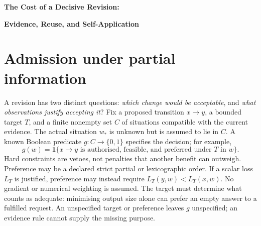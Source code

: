 \documentclass[11pt,letterpaper]{article}
\newcommand{\ind}{\mathbf 1}
\begin{document}
\begin{center}
{\Large\bfseries The Cost of a Decisive Revision:}\par
\vspace{4pt}
{\normalsize\bfseries Evidence, Reuse, and Self-Application}
\end{center}
\vspace{-3pt}
\begin{abstract}
A revision decision can be identifiable but unaffordable; evidence sufficient for it can become inadequate when its purpose changes. In a finite exact-observation model, standard decision-tree optimisation gives the minimum worst-case cost of a sound decision, both from current evidence and after reusing a retained record. A classical address-function example separates adaptive inquiry from a fixed test battery. Two elementary obstructions delimit evidence reuse and inference from behavioural parity, while a changing-objective cycle shows why locally justified revision need not terminate. The same account applies to revisions of a method and to revisions made with it. Its guarantees are relative to a specified decision rule and observation model; it neither selects the purpose nor certifies its own premises.
\end{abstract}

\section{Admission under partial information}
A revision has two distinct questions: \emph{which change would be acceptable}, and \emph{what observations justify accepting it}? Fix a proposed transition $x\to y$, a bounded target $T$, and a finite nonempty set $C$ of situations compatible with the current evidence. The actual situation $w_*$ is unknown but is assumed to lie in $C$. A known Boolean predicate $g:C\to\{0,1\}$ specifies the decision; for example,
\begin{equation}
 g(w)=\ind\{\text{$x\to y$ is authorised, feasible, and preferred under $T$ in $w$}\}.
 \label{eq:guard}
\end{equation}
Hard constraints are vetoes, not penalties that another benefit can outweigh. Preference may be a declared strict partial or lexicographic order. If a scalar loss $L_T$ is justified, preference may instead require $L_T(y,w)<L_T(x,w)$. No gradient or numerical weighting is assumed. The target must determine what counts as adequate: minimising output size alone can prefer an empty answer to a fulfilled request. An unspecified target or preference leaves $g$ unspecified; an evidence rule cannot supply the missing purpose.
\end{document}
